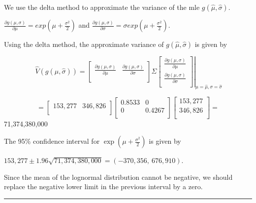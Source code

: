 \documentclass[]{book}
\theoremstyle{definition}
\theoremstyle{definition}
\theoremstyle{definition}
\theoremstyle{remark}
\begin{document}
We use the delta method to approximate the variance of the mle
\(g\left( \hat{\mu},\hat{\sigma} \right)\).

\(\frac{\partial g\left( \mu,\sigma \right)}{\partial\mu} = exp\left( \mu + \frac{\sigma^{2}}{2} \right)\)
and
\(\frac{\partial g\left( \mu,\sigma \right)}{\partial\sigma} = \sigma exp\left( \mu + \frac{\sigma^{2}}{2} \right)\).

Using the delta method, the approximate variance of
\(g\left( \hat{\mu},\hat{\sigma} \right)\) is given by

\[\left. \ \hat{V}\left( g\left( \hat{\mu},\hat{\sigma} \right) \right) = \begin{bmatrix}
\frac{\partial g\left( \mu,\sigma \right)}{\partial\mu} & \frac{\partial g\left( \mu,\sigma \right)}{\partial\sigma} \\
\end{bmatrix}\Sigma\begin{bmatrix}
\frac{\partial g\left( \mu,\sigma \right)}{\partial\mu} \\
\frac{\partial g\left( \mu,\sigma \right)}{\partial\sigma} \\
\end{bmatrix} \right|_{\mu = \hat{\mu},\sigma = \hat{\sigma}}\]

\[= \begin{bmatrix}
153,277 & 346,826 \\
\end{bmatrix}\begin{bmatrix}
0.8533 & 0 \\
0 & 0.4267 \\
\end{bmatrix}\begin{bmatrix}
153,277 \\
346,826 \\
\end{bmatrix} =\]71,374,380,000

The 95\% confidence interval for
\(\exp\left( \mu + \frac{\sigma^{2}}{2} \right)\) is given by

\(153,277 \pm 1.96\sqrt{71,374,380,000} = \left( - 370,356,\ 676,910 \right)\).

Since the mean of the lognormal distribution cannot be negative, we
should replace the negative lower limit in the previous interval by a
zero.

\begin{center}\rule{0.5\linewidth}{\linethickness}\end{center}
\end{document}
